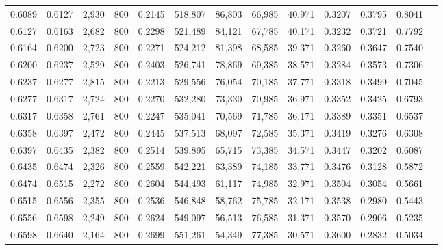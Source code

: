 \begin{tabular}{rrrrrrrrrrrrr}
0.6089 & 0.6127 &  2,930 & 800 &                                     0.2145 & 518,807 &  86,803 &  66,985 &  40,971 & 0.3207 & 0.3795 & 0.8041 \\
0.6127 & 0.6163 &  2,682 & 800 &                                     0.2298 & 521,489 &  84,121 &  67,785 &  40,171 & 0.3232 & 0.3721 & 0.7792 \\
0.6164 & 0.6200 &  2,723 & 800 &                                     0.2271 & 524,212 &  81,398 &  68,585 &  39,371 & 0.3260 & 0.3647 & 0.7540 \\
0.6200 & 0.6237 &  2,529 & 800 &                                     0.2403 & 526,741 &  78,869 &  69,385 &  38,571 & 0.3284 & 0.3573 & 0.7306 \\
0.6237 & 0.6277 &  2,815 & 800 &                                     0.2213 & 529,556 &  76,054 &  70,185 &  37,771 & 0.3318 & 0.3499 & 0.7045 \\
0.6277 & 0.6317 &  2,724 & 800 &                                     0.2270 & 532,280 &  73,330 &  70,985 &  36,971 & 0.3352 & 0.3425 & 0.6793 \\
0.6317 & 0.6358 &  2,761 & 800 &                                     0.2247 & 535,041 &  70,569 &  71,785 &  36,171 & 0.3389 & 0.3351 & 0.6537 \\
0.6358 & 0.6397 &  2,472 & 800 &                                     0.2445 & 537,513 &  68,097 &  72,585 &  35,371 & 0.3419 & 0.3276 & 0.6308 \\
0.6397 & 0.6435 &  2,382 & 800 &                                     0.2514 & 539,895 &  65,715 &  73,385 &  34,571 & 0.3447 & 0.3202 & 0.6087 \\
0.6435 & 0.6474 &  2,326 & 800 &                                     0.2559 & 542,221 &  63,389 &  74,185 &  33,771 & 0.3476 & 0.3128 & 0.5872 \\
0.6474 & 0.6515 &  2,272 & 800 &                                     0.2604 & 544,493 &  61,117 &  74,985 &  32,971 & 0.3504 & 0.3054 & 0.5661 \\
0.6515 & 0.6556 &  2,355 & 800 &                                     0.2536 & 546,848 &  58,762 &  75,785 &  32,171 & 0.3538 & 0.2980 & 0.5443 \\
0.6556 & 0.6598 &  2,249 & 800 &                                     0.2624 & 549,097 &  56,513 &  76,585 &  31,371 & 0.3570 & 0.2906 & 0.5235 \\
0.6598 & 0.6640 &  2,164 & 800 &                                     0.2699 & 551,261 &  54,349 &  77,385 &  30,571 & 0.3600 & 0.2832 & 0.5034 \\

\end{tabular}
